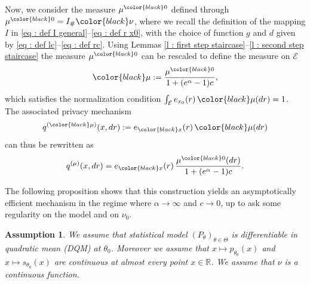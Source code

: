 \documentclass[a4paper, 11pt]{article}
\newtheorem{lemma}{Lemma}
\newtheorem{ass}{Assumption}
\theoremstyle{definition}
\newcommand{\arnaud}[1]{\todo[color=green!20]{{ #1}}}
\newcommand{\modar}{\color{black}}
\begin{document}
{{%
%	
%	
%	
%

Now, we consider the measure $\mu^{\modar0}$ defined through $\mu^{\modar0} = I_\# {\modar \nu}$,
where we recall the definition of the mapping $I$ in \eqref{eq : def I general}--\eqref{eq : def r x0}, with the choice of function $g$ and $d$ given 
by \eqref{eq : def lc}--\eqref{eq : def rc}.
Using Lemmas \ref{l : first step staircase}--\ref{l : second step staircase} %
the measure \( \mu^{\modar0} \) 
can be rescaled to define the measure on $\mathcal{E}$
\begin{equation} \label{eq : mu_0 mu}
{\modar \mu} := \frac{\mu^{\modar0}}{1 + (e^\alpha - 1)c},
\end{equation}
which satisfies the normalization condition \( \int_\mathcal{E} e_{x_0}(r)\, {\modar \mu}(dr) = 1 \).  
The associated privacy mechanism
\[
q^{({\modar \mu})}(x,dr) := e_{\modar x}(r)\, {\modar \mu}(dr)
\]
can thus be rewritten as
\begin{equation}\label{eq: q kernel}
q^{(\mu)}(x,dr)
	= e_{\modar x}(r)\, \frac{\mu^{\modar0}(dr)}{1 + (e^\alpha - 1)c }.
\end{equation}

The following proposition shows that this %
construction yields an asymptotically efficient mechanism in the regime where \( \alpha \to \infty \) and \( c \to 0 \), up to ask some regularity on the model and on $\nu_0$.

\begin{ass} \label{Ass : smoothness for staircase} 
	We assume that statistical model \( (P_{\theta})_{\theta \in \Theta} \) is differentiable in quadratic mean (DQM) {\modar at \( \theta_0 \).} %
	 Moreover we assume that $x \mapsto {p}_{\theta_0}(x)$ and $x \mapsto s_{\theta_0}(x)$ are continuous at almost every point $x\in\mathbb{R}$. We assume that {\modar $\nu$} is a continuous function. %
\end{ass}


}}
\end{document}
